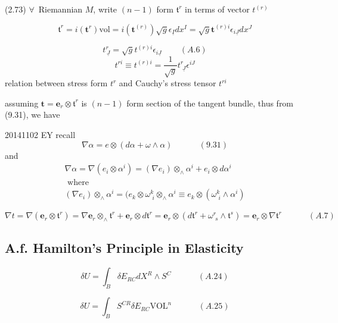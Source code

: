 \begin{appendix}
(2.73) $\forall \, $  Riemannian $M$, write $(n-1)$ form $\mathfrak{t}^r$ in terms of vector $t^{(r)}$

\[
\mathfrak{t}^r = i(\mathbf{t}^r) \text{vol} = i (\mathbf{t}^{(r)} ) \sqrt{g} \epsilon_{\underline{I}} dx^I = \sqrt{g} \mathbf{t}^{(r)i} \epsilon_{i \underline{J}} dx^J
\]

\begin{equation}
t^r_{ \, \underline{J}}  = \sqrt{g} t^{(r)i} \epsilon_{i \underline{J}} \quad \quad \, (A.6)
\end{equation}
\[
t^{ri} \equiv t^{(r)i} = \frac{1}{\sqrt{g}} t^r_{ \, \, \underline{J}} \epsilon^{i J }
\]
relation between stress form $t^r$ and Cauchy's stress tensor $t^{ri}$

assuming $\mathbf{t} = \mathbf{e}_r \otimes \mathfrak{t}^r$ is $(n-1)$ form section of the tangent bundle, thus from (9.31), we have

20141102 EY recall 
\[
\nabla \alpha = e \otimes (d\alpha + \omega \wedge \alpha) \quad \quad \quad \, (9.31)
\]
and 
\[
\begin{gathered}
        \nabla \alpha = \nabla( e_i \otimes \alpha^i) = (\nabla e_i) \otimes_{\wedge} \alpha^i + e_i \otimes d\alpha^i \\ 
 \text{ where }  \\
(\nabla e_i) \otimes_{\wedge} \alpha^i = (e_k \otimes \omega^k_{\, \, i}\otimes_{\wedge} \alpha^i \equiv e_k \otimes ( \omega^k_{\, \, i} \wedge \alpha^i)
\end{gathered}
\]

\begin{equation}
        \nabla t = \nabla (\mathbf{e}_r \otimes \mathfrak{t}^r) = \nabla \mathbf{e}_r \otimes_{\wedge} \mathfrak{t}^r + \mathbf{e}_r \otimes d\mathfrak{t}^r = \mathbf{e}_r \otimes (d\mathfrak{t}^r + \omega^r_{ \, \, s} \wedge \mathfrak{t}^s) = \mathbf{e}_r \otimes \nabla \mathfrak{t}^r \quad \quad \quad \, (A.7)
\end{equation}


\subsection{A.f. Hamilton's Principle in Elasticity}


\begin{equation}
        \delta U = \int_B \delta E_{RC} dX^R \wedge S^C \quad \quad \quad \, (A.24) 
\end{equation}

\begin{equation}
        \delta U = \int_B S^{CR} \delta E_{RC} \text{VOL}^n \quad \quad \quad \, (A.25)
\end{equation}


\end{appendix}
